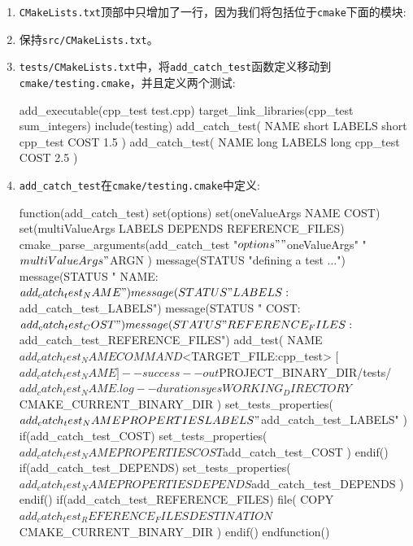 \begin{enumerate}
\item \texttt{CMakeLists.txt}顶部中只增加了一行，因为我们将包括位于\texttt{cmake}下面的模块:


\item 保持\texttt{src/CMakeLists.txt}。

\item \texttt{tests/CMakeLists.txt}中，将\texttt{add\_catch\_test}函数定义移动到\texttt{cmake/testing.cmake}，并且定义两个测试:

\begin{codebox}[cmake]
add_executable(cpp_test test.cpp)
target_link_libraries(cpp_test sum_integers)
include(testing)
add_catch_test(
  NAME
    short
  LABELS
    short
    cpp_test
  COST
    1.5
  )
add_catch_test(
  NAME
    long
  LABELS
    long
    cpp_test
  COST
    2.5
  )
\end{codebox}

\item \texttt{add\_catch\_test}在\texttt{cmake/testing.cmake}中定义:

\begin{codebox}[cmake]
function(add_catch_test)
  set(options)
  set(oneValueArgs NAME COST)
  set(multiValueArgs LABELS DEPENDS REFERENCE_FILES)
  cmake_parse_arguments(add_catch_test
    "${options}"
    "${oneValueArgs}"
    "${multiValueArgs}"
    ${ARGN}
    )
  message(STATUS "defining a test ...")
  message(STATUS " NAME: ${add_catch_test_NAME}")
  message(STATUS " LABELS: ${add_catch_test_LABELS}")
  message(STATUS " COST: ${add_catch_test_COST}")
  message(STATUS " REFERENCE_FILES: ${add_catch_test_REFERENCE_FILES}")
  add_test(
    NAME
        ${add_catch_test_NAME}
    COMMAND
        $<TARGET_FILE:cpp_test>
    [${add_catch_test_NAME}] --success --out
        ${PROJECT_BINARY_DIR}/tests/${add_catch_test_NAME}.log --durations yes
    WORKING_DIRECTORY
        ${CMAKE_CURRENT_BINARY_DIR}
    )
  set_tests_properties(${add_catch_test_NAME}
    PROPERTIES
        LABELS "${add_catch_test_LABELS}"
    )
  if(add_catch_test_COST)
    set_tests_properties(${add_catch_test_NAME}
    PROPERTIES
        COST ${add_catch_test_COST}
    )
  endif()
  if(add_catch_test_DEPENDS)
    set_tests_properties(${add_catch_test_NAME}
      PROPERTIES
        DEPENDS ${add_catch_test_DEPENDS}
      )
  endif()
  if(add_catch_test_REFERENCE_FILES)
    file(
      COPY
        ${add_catch_test_REFERENCE_FILES}
      DESTINATION
        ${CMAKE_CURRENT_BINARY_DIR}
      )
  endif()
endfunction()
\end{codebox}


\end{enumerate}
